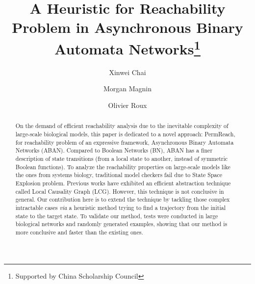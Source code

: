 \documentclass[runningheads]{llncs}
\begin{document}
%
\title{A Heuristic for Reachability Problem in Asynchronous Binary Automata Networks\thanks{Supported by
China Scholarship Council}}
%
%
\author{Xinwei Chai \and Morgan Magnin \and Olivier Roux}
%
%
%
\maketitle              %
%
\begin{abstract}
On the demand of efficient reachability analysis due to the inevitable complexity of large-scale biological models, this paper is dedicated to a novel approach: PermReach, for reachability problem of an expressive framework, Asynchronous Binary Automata Networks (ABAN). 
Compared to Boolean Networks (BN), ABAN has a finer description of state transitions (from a local state to another, instead of symmetric Boolean functions). 
To analyze the reachability properties on large-scale models like the ones from systems biology, traditional model checkers fail due to State Space Explosion problem.
Previous works have exhibited an efficient abstraction technique called Local Causality Graph (LCG).
However, this technique is not conclusive in general.
Our contribution here is to extend the technique by tackling those complex intractable cases \textit{via} a heuristic method trying to find a trajectory from the initial state to the target state. 
To validate our method, tests were conducted in large biological networks and randomly generated examples, showing that our method is more conclusive and faster than the existing ones.

\end{abstract}
\end{document}
